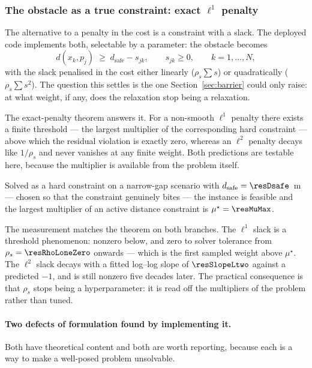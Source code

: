 \documentclass[11pt,a4paper]{article}
\newcommand{\dsafe}{d_{\mathrm{safe}}}
\begin{document}
\subsubsection{The obstacle as a true constraint: exact \texorpdfstring{$\ell^1$}{l1} penalty}
\label{sec:l1}

The alternative to a penalty in the cost is a constraint with a slack. The deployed code implements both,
selectable by a parameter: the obstacle becomes
\begin{equation}
  d(x_k,p_j)\;\ge\;\dsafe-s_{jk},\qquad s_{jk}\ge0,\qquad k=1,\dots,N,
  \label{eq:slack}
\end{equation}
with the slack penalised in the cost either linearly ($\rho_s\sum s$) or quadratically ($\rho_s\sum s^2$). The
question this settles is the one Section~\ref{sec:barrier} could only raise: at what weight, if any, does the
relaxation stop being a relaxation.

The exact-penalty theorem answers it. For a non-smooth $\ell^1$ penalty there exists a finite threshold ---
the largest multiplier of the corresponding hard constraint --- above which the residual violation is exactly
zero, whereas an $\ell^2$ penalty decays like $1/\rho_s$ and never vanishes at any finite weight. Both
predictions are testable here, because the multiplier is available from the problem itself.

Solved as a hard constraint on a narrow-gap scenario with $\dsafe=\resDsafe$~m --- chosen so that the
constraint genuinely bites --- the instance is feasible and the largest multiplier of an active distance
constraint is $\mu^\star=\resMuMax$.


The measurement matches the theorem on both branches. The $\ell^1$ slack is a threshold phenomenon: nonzero
below, and zero to solver tolerance from $\rho_s=\resRhoLoneZero$ onwards --- which is the first sampled weight
above $\mu^\star$. The $\ell^2$ slack decays with a fitted log--log slope of $\resSlopeLtwo$ against a
predicted $-1$, and is still nonzero five decades later. The practical consequence is that $\rho_s$ stops being
a hyperparameter: it is read off the multipliers of the problem rather than tuned.

\paragraph{Two defects of formulation found by implementing it.} Both have theoretical content and both are
worth reporting, because each is a way to make a well-posed problem unsolvable.
\end{document}
